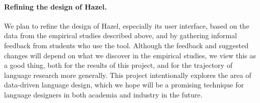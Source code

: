 \documentclass[letterpaper,USenglish]{lipics-v2016}
\newcommand{\Hazel}[0]{\textsf{Hazel}}
\begin{document}
\paragraph{Refining the design of \Hazel.} 
We plan to refine the design of \Hazel, especially its user interface,
based on the data from the empirical studies described above, and by
gathering informal feedback from students who use the tool.
%
Although the feedback and suggested changes will depend on what we
discover in the empirical studies, we view this as a good thing, both
for the results of this project, and for the trajectory of language
research more generally.  This project intentionally explores the area
of data-driven language design, which we hope will be a promising
technique for language designers in both academia and industry in the
future.







\appendix
\end{document}

